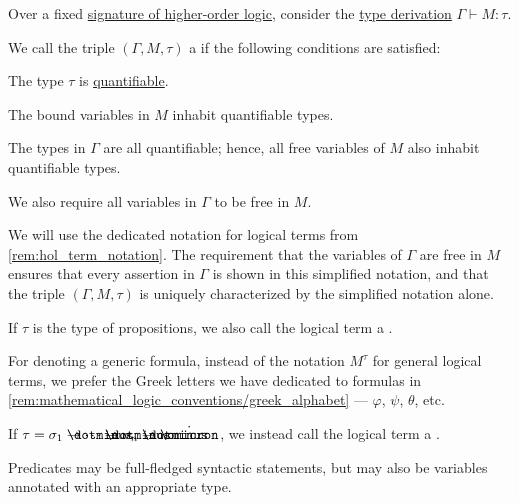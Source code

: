 \begin{definition}\label{def:hol_term}\mimprovised
  Over a fixed \hyperref[def:hol_signature]{signature of higher-order logic}, consider the \hyperref[def:mltt_entailment]{type derivation} \( \Gamma \vdash M: \tau \).

  We call the triple \( (\Gamma, M, \tau) \) a  if the following conditions are satisfied:
  \begin{thmenum}[series=def:hol_term]
     The type \( \tau \) is \hyperref[def:hol_signature/universes/quant]{quantifiable}.

     The bound variables in \( M \) inhabit quantifiable types.

     The types in \( \Gamma \) are all quantifiable; hence, all free variables of \( M \) also inhabit quantifiable types.

    We also require all variables in \( \Gamma \) to be free in \( M \).
  \end{thmenum}

  We will use the dedicated notation for logical terms from \cref{rem:hol_term_notation}. The requirement that the variables of \( \Gamma \) are free in \( M \) ensures that every assertion in \( \Gamma \) is shown in this simplified notation, and that the triple \( (\Gamma, M, \tau) \) is uniquely characterized by the simplified notation alone.

  \begin{thmenum}[resume=def:hol_term]
     If \( \tau \) is the type of propositions, we also call the logical term a .

    For denoting a generic formula, instead of the notation \( M^\tau \) for general logical terms, we prefer the Greek letters we have dedicated to formulas in \cref{rem:mathematical_logic_conventions/greek_alphabet} --- \( \varphi \), \( \psi \), \( \theta \), etc.

     If \( \tau = \sigma_1 \synimplies \cdots \synimplies \sigma_n \synimplies \syn\omicron \), we instead call the logical term a .

    Predicates may be full-fledged syntactic statements, but may also be variables annotated with an appropriate type.
  \end{thmenum}
\end{definition}
